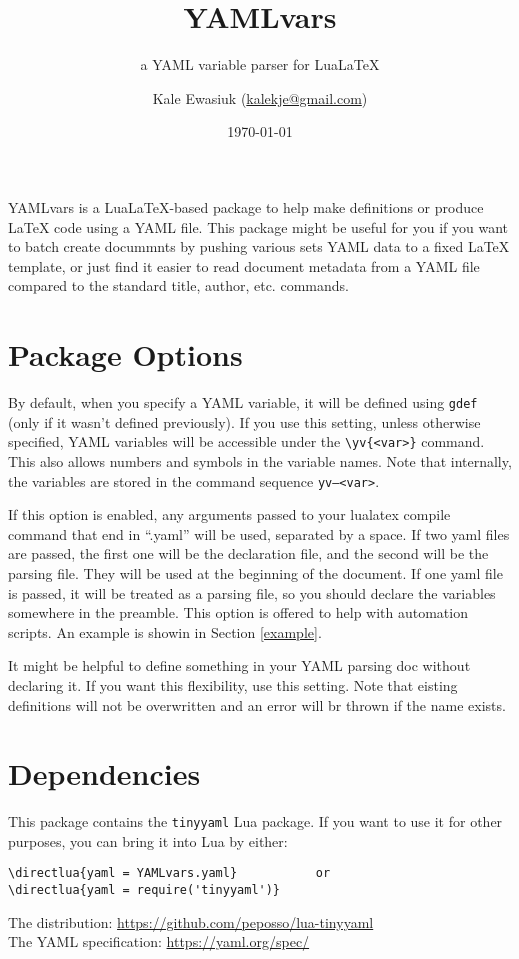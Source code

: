 \documentclass[11pt,parskip=half]{scrartcl}
\author{Kale Ewasiuk (\url{kalekje@gmail.com})}
\date{\today}
\title{YAMLvars}
\subtitle{a YAML variable parser for LuaLaTeX}
\begin{document}
\maketitle

YAMLvars is a LuaLaTeX-based package to help make definitions or produce LaTeX code using a YAML file.
This package might be useful for you if you want to batch create docummnts
by pushing various sets YAML data to a fixed LaTeX template,
or just find it easier to read document metadata from a YAML file compared to the
standard title, author, etc. commands.

\section{Package Options}
\leavevmode{}By default, when you specify a YAML variable, it will be defined using \texttt{gdef}
(only if it wasn't defined previously).
If you use this setting, unless otherwise specified, YAML variables will be accessible under
the \texttt{\textbackslash yv\{<var>\}} command.
This also allows numbers and symbols in the variable names.
Note that internally, the variables are stored in the command sequence
\texttt{yv--<var>}.

\leavevmode{}If this option is enabled, any arguments passed to your lualatex compile
command that end in ``.yaml'' will be used, separated by a space.
If two yaml files are passed, the first one will be the declaration file,
and the second will be the parsing file.
They will be used at the beginning of the document.
If one yaml file is passed, it will be treated as a parsing file, so you should
declare the variables somewhere in the preamble.
This option is offered to help with automation scripts.
An example is showin in Section \ref{example}.

\leavevmode{}%
It might be helpful to define something in your YAML parsing doc without declaring it.
If you want this flexibility, use this setting. Note that eisting definitions will not be overwritten and an error
will br thrown if the name exists.

\section{Dependencies}
This package contains the \texttt{tinyyaml} Lua package.
If you want to use it for other purposes, you can bring it into Lua by either:
\begin{verbatim}
\directlua{yaml = YAMLvars.yaml}           or
\directlua{yaml = require('tinyyaml')}
\end{verbatim}
The distribution: \url{https://github.com/peposso/lua-tinyyaml}\\
The YAML specification: \url{https://yaml.org/spec/}\\
\end{document}

